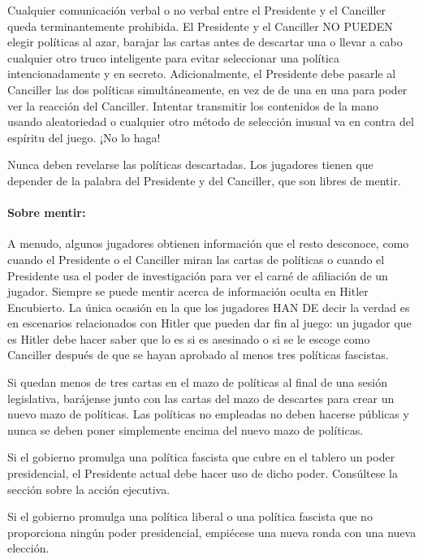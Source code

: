 \documentclass[13pt,a4paper,twocolumn,titlepage]{scrartcl}
\begin{document}
	Cualquier comunicación verbal o no verbal entre el Presidente y el Canciller queda terminantemente prohibida. El Presidente y el Canciller NO PUEDEN elegir políticas al azar, barajar las cartas antes de descartar una o llevar a cabo cualquier otro truco inteligente para evitar seleccionar una política intencionadamente y en secreto. Adicionalmente, el Presidente debe pasarle al Canciller las dos políticas simultáneamente, en vez de de una en una para poder ver la reacción del Canciller. Intentar transmitir los contenidos de la mano usando aleatoriedad o cualquier otro método de selección inusual va en contra del espíritu del juego. ¡No lo haga!
	
	\textcolor{Blue3}{Nunca deben revelarse las políticas descartadas. Los jugadores tienen que depender de la palabra del Presidente y del Canciller, que son libres de mentir.}
	
	\vspace*{-8mm}
	\paragraph{\textcolor{SeaGreen4}{Sobre mentir:}}
	\textcolor{SeaGreen4}
	{
		A menudo, algunos jugadores obtienen información que el resto desconoce, como cuando el Presidente o el Canciller miran las cartas de políticas o cuando el Presidente usa el poder de investigación para ver el carné de afiliación de un jugador. Siempre se puede mentir acerca de información oculta en Hitler Encubierto. La única ocasión en la que los jugadores HAN DE decir la verdad es en escenarios relacionados con Hitler que pueden dar fin al juego: un jugador que es Hitler debe hacer saber que lo es si es asesinado o si se le escoge como Canciller después de que se hayan aprobado al menos tres políticas fascistas.}
	
	\textcolor{Blue3}{Si quedan menos de tres cartas en el mazo de políticas al final de una sesión legislativa}, barájense junto con las cartas del mazo de descartes para crear un nuevo mazo de políticas. Las políticas no empleadas no deben hacerse públicas y nunca se deben poner simplemente encima del nuevo mazo de políticas.
	
	\textcolor{Blue3}{Si el gobierno promulga una política \textcolor{fascist}{fascista} que cubre en el tablero un poder presidencial}, el Presidente actual debe hacer uso de dicho poder. Consúltese la sección sobre la acción ejecutiva.
	
	\textcolor{Blue3}{Si el gobierno promulga una política \textcolor{liberal}{liberal} o una política \textcolor{fascist}{fascista} que no proporciona ningún poder presidencial}, empiécese una nueva ronda con una nueva elección.
	
\end{document}
